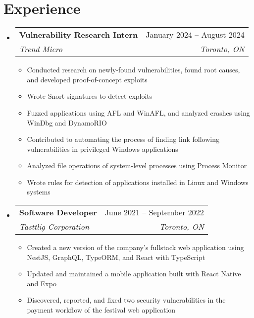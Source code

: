\documentclass[letterpaper,11pt]{article}
\makeatletter
\newcommand{\resumeItem}[1]{
  \item\small{
    {#1 \vspace{-2pt}}
  }
}
\newcommand{\resumeSubheading}[4]{
  \vspace{-2pt}\item
    \begin{tabular*}{0.97\textwidth}[t]{l@{\extracolsep{\fill}}r}
      \textbf{#1} & #2 \\
      \textit{\small#3} & \textit{\small #4} \\
    \end{tabular*}\vspace{-7pt}
}
\newcommand{\resumeSubSubheading}[2]{
    \item
    \begin{tabular*}{0.97\textwidth}{l@{\extracolsep{\fill}}r}
      \textit{\small#1} & \textit{\small #2} \\
    \end{tabular*}\vspace{-7pt}
}
\newcommand{\resumeSubHeadingListStart}{\begin{itemize}[leftmargin=0.15in, label={}]}
\newcommand{\resumeSubHeadingListEnd}{\end{itemize}}
\newcommand{\resumeItemListStart}{\begin{itemize}}
\newcommand{\resumeItemListEnd}{\end{itemize}\vspace{-5pt}}
\makeatother
\begin{document}
\section{Experience}
  \resumeSubHeadingListStart
    \resumeSubheading
      {Vulnerability Research Intern}{January 2024 -- August 2024}
      {Trend Micro}{Toronto, ON}
      \resumeItemListStart
        \resumeItem{Conducted research on newly-found vulnerabilities, found root causes, and developed proof-of-concept exploits}
        \resumeItem{Wrote Snort signatures to detect exploits}
        \resumeItem{Fuzzed applications using AFL and WinAFL, and analyzed crashes using WinDbg and DynamoRIO}
        \resumeItem{Contributed to automating the process of finding link following vulnerabilities in privileged Windows applications}
        \resumeItem{Analyzed file operations of system-level processes using Process Monitor}
        \resumeItem{Wrote rules for detection of applications installed in Linux and Windows systems}
      \resumeItemListEnd

    \resumeSubheading
      {Software Developer}{June 2021 -- September 2022}
      {Tasttlig Corporation}{Toronto, ON}
      \resumeItemListStart
        \resumeItem{Created a new version of the company's fullstack web application
        using NestJS, GraphQL, TypeORM, and React with TypeScript}
        \resumeItem{Updated and maintained a mobile application built with React Native and Expo}
        \resumeItem{Discovered, reported, and fixed two security vulnerabilities
        in the payment workflow of the festival web application}
      \resumeItemListEnd
      
  \resumeSubHeadingListEnd
\end{document}
